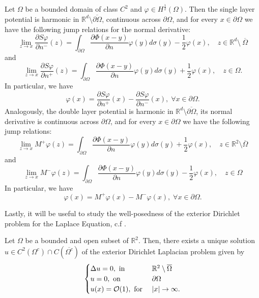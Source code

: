 \begin{proposition}\label{sl_jump}
    Let \(\Omega\) be a bounded domain of class \(C^2\) and \(\varphi \in H^\frac{1}{2}(\Omega)\). Then the single layer potential is harmonic in \(\mathbb{R}^d\setminus \overline{\partial\Omega}\), continuous across \(\partial\Omega\), and for every \(x \in \partial\Omega\) we have the following jump relations for the normal derivative:
    \[
        \lim_{z \rightarrow x} \frac{\partial S\varphi}{\partial n^-}(z) = \int_{\partial\Omega} \frac{\partial\Phi(x-y)}{\partial n}\varphi(y) d\sigma(y) - \frac{1}{2}\varphi(x), \quad z \in \mathbb{R}^d \setminus \ \overline{\Omega}
    \]
    and
    \[
        \lim_{z \rightarrow x} \frac{\partial S\varphi}{\partial n^+}(z) = \int_{\partial\Omega} \frac{\partial\Phi(x-y)}{\partial n}\varphi(y) d\sigma(y) + \frac{1}{2}\varphi(x), \quad z \in \Omega.
    \]
    In particular, we have
    \[
        \varphi(x) = \frac{\partial S\varphi}{\partial n^+}(x)-\frac{\partial S\varphi}{\partial n^-}(x), \; \forall x \in \partial\Omega.
    \]
    Analogously, the double layer potential is harmonic in \(\mathbb{R}^d\setminus \overline{\partial\Omega}\), its normal derivative is continuous across \(\partial\Omega\), and for every \(x \in \partial\Omega\) we have the following jump relations:
    \[
        \lim_{z \rightarrow x} M^+\varphi(z) = \int_{\partial\Omega} \frac{\partial\Phi(x-y)}{\partial n}\varphi(y) d\sigma(y) + \frac{1}{2}\varphi(x), \quad z \in \mathbb{R}^2\setminus\overline{\Omega}
    \]
    and
    \[
        \lim_{z \rightarrow x} M^-\varphi(z) = \int_{\partial\Omega} \frac{\partial\Phi(x-y)}{\partial n}\varphi(y) d\sigma(y) - \frac{1}{2}\varphi(x), \quad z \in \Omega
    \]
    In particular, we have
    \[
        \varphi(x) = M^+\varphi(x)-M^-\varphi(x), \; \forall x \in \partial\Omega.
    \]
\end{proposition}
Lastly, it will be useful to study the well-posedness of the exterior Dirichlet problem for the Laplace Equation, c.f \cite{salsa2016partial}.
\begin{theorem}
    Let \(\Omega\) be a bounded and open subset of \(\mathbb{R}^2\). Then, there exists a unique solution \(u \in C^2(\Omega^c) \cap C(\overline{\Omega^c})\) of the exterior Dirichlet Laplacian problem given by
    \[
        \begin{cases}
            \Delta u = 0, \text{ in } & \mathbb{R}^2\setminus \overline{\Omega}\\
            u = 0, \text{ on } & \partial \Omega\\
            u(x) = \mathcal{O}(1), \text{ for } & \abs{x} \rightarrow \infty.
        \end{cases}
    \]
\end{theorem}
